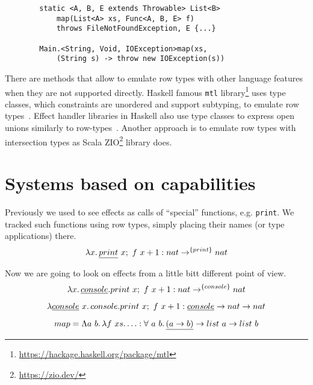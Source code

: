 \documentclass[conference]{IEEEtran}
\newcommand{\ap}{~}
\begin{document}
    \begin{verbatim}
        static <A, B, E extends Throwable> List<B>
            map(List<A> xs, Func<A, B, E> f)
            throws FileNotFoundException, E {...}

        Main.<String, Void, IOException>map(xs,
            (String s) -> throw new IOException(s))
    \end{verbatim}

    There are methods that allow to emulate row types with other language features when they are not supported directly.
    Haskell famous \texttt{mtl} library\footnote{\url{https://hackage.haskell.org/package/mtl}} uses type classes, which constraints are unordered and support subtyping, to emulate row types~\cite{mtl}.
    Effect handler libraries in Haskell also use type classes to express open unions similarly to row-types~\cite{alacarte}.
    Another approach is to emulate row types with intersection types as Scala ZIO\footnote{\url{https://zio.dev/}} library does.



    \section{Systems based on capabilities}








    Previously we used to see effects as calls of ``special'' functions, e.g. \texttt{print}.
    We tracked such functions using row types, simply placing their names (or type applications) there.
    \[\lambda x\ldotp \underline{print}\ap x;~f\ap x + 1 : nat \to^{\{print\}} nat\]

    Now we are going to look on effects from a little bitt different point of view.
    \[\lambda x\ldotp \underline{console}.print\ap x;~f\ap x + 1 : nat \to^{\{console\}} nat\]

    \[\lambda \underline{console} \ap x \ldotp console.print\ap x;~f\ap x + 1 : \underline{console} \to nat \to nat\]


    \[map = \Lambda a \ap b\ldotp \lambda f\ap xs\ldotp \ldots : \forall \ap a \ap b\ldotp \underline{(a \to b)} \to list \ap a \to list \ap b \]



\end{document}
